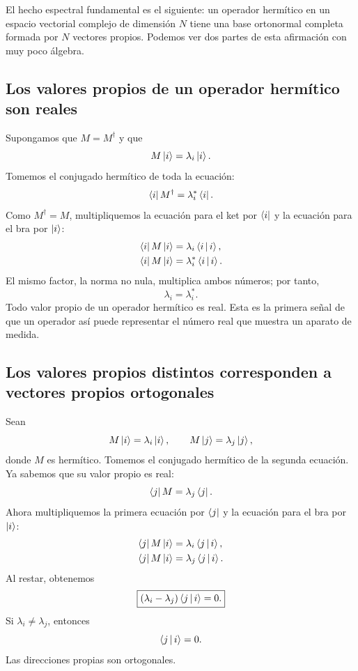 El hecho espectral fundamental es el siguiente: un operador hermítico en un espacio vectorial complejo de dimensión \(N\) tiene una base ortonormal completa formada por \(N\) vectores propios. Podemos ver dos partes de esta afirmación con muy poco álgebra.

\subsection{Los valores propios de un operador hermítico son reales}

Supongamos que \(M=M^\dagger\) y que
\[
M\left\lvert i\right\rangle=\lambda_i\left\lvert i\right\rangle.
\]
Tomemos el conjugado hermítico de toda la ecuación:
\begin{equation}
\left\langle i\right\rvert M^\dagger=\lambda_i^*\left\langle i\right\rvert.
\label{eq:eigen-bra-equation}
\end{equation}
Como \(M^\dagger=M\), multipliquemos la ecuación para el ket por \(\left\langle i\right\rvert\) y la ecuación para el bra por \(\left\lvert i\right\rangle\):
\begin{align}
\left\langle i\right\rvert M\left\lvert i\right\rangle&=\lambda_i\left\langle i\,\middle|\,i\right\rangle,\\
\left\langle i\right\rvert M\left\lvert i\right\rangle&=\lambda_i^*\left\langle i\,\middle|\,i\right\rangle.
\end{align}
El mismo factor, la norma no nula, multiplica ambos números; por tanto,
\begin{equation}
\lambda_i=\lambda_i^*.
\end{equation}
Todo valor propio de un operador hermítico es real. Esta es la primera señal de que un operador así puede representar el número real que muestra un aparato de medida.

\subsection{Los valores propios distintos corresponden a vectores propios ortogonales}

Sean
\[
M\left\lvert i\right\rangle=\lambda_i\left\lvert i\right\rangle,
\qquad
M\left\lvert j\right\rangle=\lambda_j\left\lvert j\right\rangle,
\]
donde \(M\) es hermítico. Tomemos el conjugado hermítico de la segunda ecuación. Ya sabemos que su valor propio es real:
\[
\left\langle j\right\rvert M=\lambda_j\left\langle j\right\rvert.
\]
Ahora multipliquemos la primera ecuación por \(\left\langle j\right\rvert\) y la ecuación para el bra por \(\left\lvert i\right\rangle\):
\begin{align}
\left\langle j\right\rvert M\left\lvert i\right\rangle&=\lambda_i\left\langle j\,\middle|\,i\right\rangle,\\
\left\langle j\right\rvert M\left\lvert i\right\rangle&=\lambda_j\left\langle j\,\middle|\,i\right\rangle.
\end{align}
Al restar, obtenemos
\begin{equation}
\boxed{(\lambda_i-\lambda_j)\left\langle j\,\middle|\,i\right\rangle=0.}
\label{eq:hermitian-orthogonality}
\end{equation}
Si \(\lambda_i\ne\lambda_j\), entonces
\[
\left\langle j\,\middle|\,i\right\rangle=0.
\]
Las direcciones propias son ortogonales.

